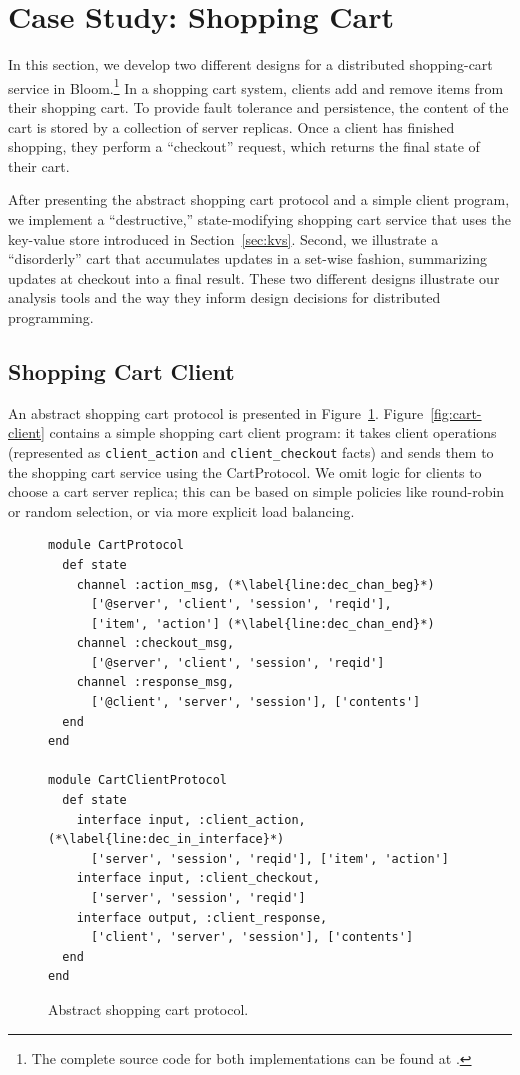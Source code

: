 \section{Case Study: Shopping Cart}
\label{sec:case}
In this section, we develop two different designs for a distributed
shopping-cart service in Bloom.\footnote{The complete source code for both
  implementations can be found at
  .}  In a
shopping cart system, clients add and remove items from their shopping cart. To
provide fault tolerance and persistence, the content of the cart is stored by a
collection of server replicas. Once a client has finished shopping, they perform
a ``checkout'' request, which returns the final state of their cart.

After presenting the abstract shopping cart protocol and a simple client
program, we implement a ``destructive,'' state-modifying shopping cart service
that uses the key-value store introduced in Section~\ref{sec:kvs}. Second, we
illustrate a ``disorderly'' cart that accumulates updates in a set-wise fashion,
summarizing updates at checkout into a final result.  These two different
designs illustrate our analysis tools and the way they inform design decisions
for distributed programming.

\subsection{Shopping Cart Client}
An abstract shopping cart protocol is presented in
Figure~\ref{fig:cart-protocol}. Figure~\ref{fig:cart-client} contains a simple
shopping cart client program: it takes client operations (represented as
\texttt{client\_action} and \texttt{client\_checkout} facts) and sends them to
the shopping cart service using the CartProtocol. We omit logic for clients to choose a cart server replica; this can be based on simple policies like round-robin or random selection, or via more explicit load balancing.

\begin{figure}[t]
\begin{scriptsize}
\begin{lstlisting}
module CartProtocol
  def state
    channel :action_msg, (*\label{line:dec_chan_beg}*)
      ['@server', 'client', 'session', 'reqid'],
      ['item', 'action'] (*\label{line:dec_chan_end}*)
    channel :checkout_msg,
      ['@server', 'client', 'session', 'reqid']
    channel :response_msg,
      ['@client', 'server', 'session'], ['contents']
  end
end

module CartClientProtocol
  def state
    interface input, :client_action, (*\label{line:dec_in_interface}*)
      ['server', 'session', 'reqid'], ['item', 'action'] 
    interface input, :client_checkout,
      ['server', 'session', 'reqid']
    interface output, :client_response, 
      ['client', 'server', 'session'], ['contents']
  end
end
\end{lstlisting}
\vspace{-10pt}
\caption{Abstract shopping cart protocol.}
\label{fig:cart-protocol}
\end{scriptsize}
\vspace{-2pt}
\end{figure}


